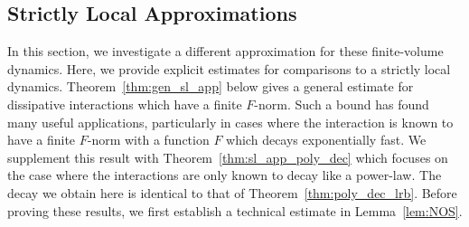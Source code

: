 \documentclass{article}
\newcommand{\<}{\langle}
\renewcommand{\>}{\rangle}
\numberwithin{equation}{section}
\theoremstyle{definition}
\begin{document}
%



\subsection{Strictly Local Approximations}\label{sl_Approx}


In this section, we investigate a different approximation for these finite-volume dynamics. 
Here, we provide explicit estimates for comparisons to a strictly local dynamics. 
Theorem~\ref{thm:gen_sl_app} below gives a general estimate for dissipative interactions which have a
finite $F$-norm. Such a bound has found many useful applications, particularly in cases where
the interaction is known to have a finite $F$-norm with a function $F$ which decays exponentially fast.
We supplement this result with Theorem~\ref{thm:sl_app_poly_dec} which focuses on the case where
the interactions are only known to decay like a power-law. The decay we obtain here is identical to that of 
Theorem~\ref{thm:poly_dec_lrb}. Before proving these results, we first establish a technical estimate in 
Lemma~\ref{lem:NOS}.
\end{document}

